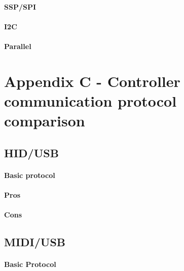\documentclass[a4paper,10pt]{article}
\begin{document}
\begin{multicols}{2}
\TODO


\paragraph{SSP/SPI}
\TODO


\paragraph{I2C}
\TODO


\paragraph{Parallel}
\TODO



\section{Appendix C - Controller communication protocol comparison}

\TODO


\subsection{HID/USB}

\TODO


\paragraph{Basic protocol}
\TODO


\paragraph{Pros}
\TODO


\paragraph{Cons}
\TODO


\subsection{MIDI/USB}

\TODO


\paragraph{Basic Protocol}
\TODO



\end{multicols}
\end{document}
